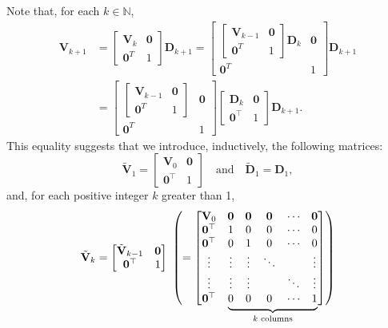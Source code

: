 \documentclass[11pt,a4paper]{article}
\newcommand\undermat[2]{%
  \makebox[0pt][l]{$\smash{\underbrace{\phantom{%
    \begin{bmatrix}#2\end{bmatrix}}}_{\text{$#1$}}}$}#2}
\newcommand{\0}{\M{0}}
\newcommand{\M}[1]{\mathbf{#1}}
\newcommand{\Mt}[1]{\tilde{\M{#1}}}
\newcommand{\N}{\mathbb{N}}
\newcommand{\T}{\top}
\begin{document}
Note that, for each $k \in \N$, 
\begin{align*}
  \M{V}_{k+1}
  &
    =
    \begin{bmatrix}
      \M{V}_k & \0
      \\
      \0^T & 1
    \end{bmatrix}
             \M{D}_{k+1}
             =
             \begin{bmatrix}
               \begin{bmatrix}
                 \M{V}_{k-1} & \0
                 \\
                 \0^T & 1
               \end{bmatrix}
               \M{D}_k & \0
               \\
               \0^T & 1
             \end{bmatrix}
                      \M{D}_{k+1}
  \\
  & =
    \begin{bmatrix}
      \begin{bmatrix}
        \M{V}_{k-1} & \0
        \\
        \0^T & 1
      \end{bmatrix}
      & \0
      \\
      \0^T & 1
    \end{bmatrix}
             \begin{bmatrix}
               \M{D}_k & \0
               \\
               \0^\T & 1
             \end{bmatrix}
                       \M{D}_{k+1}.
\end{align*}
This equality suggests that we introduce, inductively, the following matrices:
\begin{displaymath}
  \Mt{V}_1
  =
  \begin{bmatrix}
    \M{V}_0 & \0
    \\
    \0^\T & 1
  \end{bmatrix}
  \quad
  \text{and}
  \quad
  \Mt{D}_1 = \M{D}_1,
\end{displaymath}
and, for each positive integer $k$ greater than 1, 
\begin{displaymath}
  \Mt{V}_k
  =
  \begin{bmatrix}
    \Mt{V}_{k-1} & \0
    \\
    \0^\T & 1
  \end{bmatrix}
            \
            \left(=
            \begin{bmatrix}
              \M{V}_0 & \0 & \0 & \0 & \cdots & \0
              \\
              \0^\T & 1 & 0 &  0 & \cdots & 0
              \\
              \0^\T & 0 & 1 & 0 & \cdots & 0
              \\
              \vdots & \vdots & \vdots & \ddots & & \vdots 
              \\
              \vdots & \vdots & \vdots & & \ddots & \vdots 
              \\
              \0^\T & \undermat{\text{$k$ columns}}{0 & 0 & 0 & \cdots & 1}
            \end{bmatrix}
                                           \right)
\end{displaymath}
\end{document}
